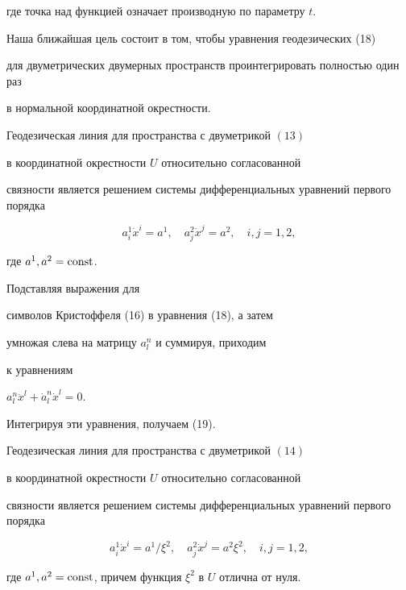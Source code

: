 где точка над функцией означает производную по параметру $t$.


Наша ближайшая цель состоит в том, чтобы уравнения геодезических (18)


для двуметрических двумерных пространств проинтегрировать полностью один раз


в нормальной координатной окрестности.





\begin{thm} 


Геодезическая линия для пространства с двуметрикой $(13)$


в координатной окрестности $U$ относительно согласованной


связности является решением системы дифференциальных уравнений первого порядка


\begin{equation}


a^1_i\dot{x}^i=a^1,\quad a^2_j\dot{x}^j=a^2,\quad i,j=1,2,


\end{equation}


где $a^1,a^2=\operatorname{const}$.


\end{thm}





\begin{pf}


Подставляя выражения для


символов Кристоффеля (16) в уравнения (18), а затем


умножая слева на матрицу $a^n_l$ и суммируя, приходим


к уравнениям


$a^n_l\ddot{x}^l+ \Dot{a}_l^n\dot{x}^l=0$.


Интегрируя эти уравнения, получаем (19).


\end{pf}





\begin{thm}


Геодезическая линия для пространства с двуметрикой $(14)$


в координатной окрестности $U$ относительно согласованной


связности является решением системы дифференциальных уравнений первого порядка


\begin{equation}


a^1_i\dot{x}^i=a^1/\xi^2,\quad a^2_j\dot{x}^j=a^2\xi^2,\quad i,j=1,2,


\end{equation}


где $a^1,a^2=\operatorname{const}$, причем функция $\xi^2$ в $U$ отлична от нуля.


\end{thm}





